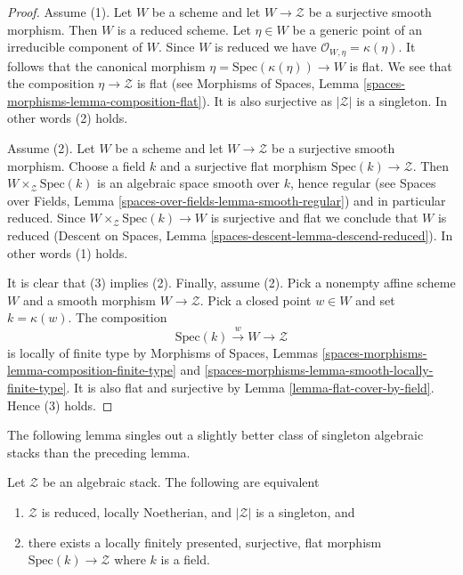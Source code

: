 \begin{proof}
Assume (1). Let $W$ be a scheme and
let $W \to \mathcal{Z}$ be a surjective smooth morphism. Then $W$ is
a reduced scheme. Let $\eta \in W$ be a generic point of an irreducible
component of $W$. Since $W$ is reduced we have
$\mathcal{O}_{W, \eta} = \kappa(\eta)$. It follows that the canonical
morphism $\eta = \text{Spec}(\kappa(\eta)) \to W$ is flat. We see that the
composition $\eta \to \mathcal{Z}$ is flat (see
Morphisms of Spaces, Lemma \ref{spaces-morphisms-lemma-composition-flat}).
It is also surjective as $|\mathcal{Z}|$ is a singleton. In other words
(2) holds.

\medskip\noindent
Assume (2). Let $W$ be a scheme and
let $W \to \mathcal{Z}$ be a surjective smooth morphism. Choose a field
$k$ and a surjective flat morphism $\text{Spec}(k) \to \mathcal{Z}$.
Then $W \times_\mathcal{Z} \text{Spec}(k)$ is an algebraic space smooth
over $k$, hence regular (see
Spaces over Fields, Lemma \ref{spaces-over-fields-lemma-smooth-regular})
and in particular reduced. Since $W \times_\mathcal{Z} \text{Spec}(k) \to W$
is surjective and flat we conclude that $W$ is reduced
(Descent on Spaces, Lemma \ref{spaces-descent-lemma-descend-reduced}).
In other words (1) holds.

\medskip\noindent
It is clear that (3) implies (2). Finally, assume (2). Pick a nonempty
affine scheme $W$ and a smooth morphism $W \to \mathcal{Z}$. Pick a closed
point $w \in W$ and set $k = \kappa(w)$. The composition
$$
\text{Spec}(k) \xrightarrow{w} W \longrightarrow \mathcal{Z}
$$
is locally of finite type by
Morphisms of Spaces, Lemmas
\ref{spaces-morphisms-lemma-composition-finite-type} and
\ref{spaces-morphisms-lemma-smooth-locally-finite-type}.
It is also flat and surjective by
Lemma \ref{lemma-flat-cover-by-field}.
Hence (3) holds.
\end{proof}

\noindent
The following lemma singles out a slightly better class of singleton
algebraic stacks than the preceding lemma.

\begin{lemma}
\label{lemma-unique-point-better}
Let $\mathcal{Z}$ be an algebraic stack. The following are equivalent
\begin{enumerate}
\item $\mathcal{Z}$ is reduced, locally Noetherian, and $|\mathcal{Z}|$
is a singleton, and
\item there exists a locally finitely presented, surjective, flat morphism
$\text{Spec}(k) \to \mathcal{Z}$ where $k$ is a field.
\end{enumerate}
\end{lemma}


